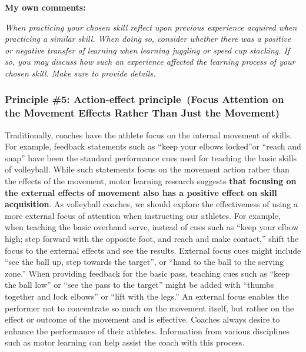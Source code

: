 \documentclass[
  letterpaper,
  DIV=11,
  numbers=noendperiod]{scrartcl}
\begin{document}
\textbf{My own comments:}

\emph{When practicing your chosen skill reflect upon previous experience
acquired when practicing a similar skill. When doing so, consider
whether there was a positive or negative transfer of learning when
learning juggling or speed cup stacking. If so, you may discuss how such
an experience affected the learning process of your chosen skill. Make
sure to provide details.}

\hypertarget{principle-5-action-effect-principle-focus-attention-on-the-movement-effects-rather-than-just-the-movement}{%
\subsubsection{\texorpdfstring{\textbf{Principle \#5: Action-effect
principle~(Focus Attention on the Movement Effects Rather Than Just the
Movement)}}{Principle \#5: Action-effect principle~(Focus Attention on the Movement Effects Rather Than Just the Movement)}}\label{principle-5-action-effect-principle-focus-attention-on-the-movement-effects-rather-than-just-the-movement}}

Traditionally, coaches have the athlete focus on the internal movement
of skills. For example, feedback statements such as ``keep your elbows
locked''or ``reach and snap'' have been the standard performance cues
used for teaching the basic skills of volleyball. While such statements
focus on the movement action rather than the effects of the movement,
motor learning research suggests \textbf{that focusing on the external
effects of movement also has a positive effect on skill acquisition}. As
volleyball coaches, we should explore the effectiveness of using a more
external focus of attention when instructing our athletes. For example,
when teaching the basic overhand serve, instead of cues such as ``keep
your elbow high; step forward with the opposite foot, and reach and make
contact,'' shift the focus to the external effects and see the results.
External focus cues might include ``see the ball up, step towards the
target'', or ``hand to the ball to the serving zone.'' When providing
feedback for the basic pass, teaching cues such as ``keep the ball low''
or ``see the pass to the target'' might be added with ``thumbs together
and lock elbows'' or ``lift with the legs.'' An external focus enables
the performer not to concentrate so much on the movement itself, but
rather on the effect or outcome of the movement and is effective.
Coaches always desire to enhance the performance of their athletes.
Information from various disciplines such as motor learning can help
assist the coach with this process.
\end{document}
